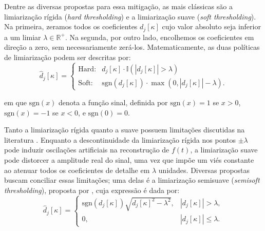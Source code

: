 Dentre as diversas propostas para essa mitigação, as mais clássicas são a limiarização rígida (\emph{hard thresholding}) e a limiarização suave (\emph{soft thresholding}). 
Na primeira, zeramos todos os coeficientes \(d_j[\kappa]\) cujo valor absoluto seja inferior a um limiar \(\lambda \in \mathbb{R}^{+}\). 
Na segunda, por outro lado, encolhemos os coeficientes em direção a zero, sem necessariamente zerá-los. 
Matematicamente, as duas políticas de limiarização podem ser descritas por: 
\begin{equation}
    \hat{d}_j[\kappa] = 
    \begin{cases} 
        \text{Hard:} & d_j[\kappa] \cdot \mathbb{I}(|d_j[\kappa]| > \lambda) \\
        \text{Soft:} & \mathrm{sgn}(d_j[\kappa]) \cdot \max(0, |d_j[\kappa]| - \lambda).
    \end{cases}
    \label{eq:threshold_policies}
\end{equation}

\noindent em que \(\mathrm{sgn}(x)\) denota a função sinal, definida por \(\mathrm{sgn}(x) = 1\) se \(x > 0\), \(\mathrm{sgn}(x) = -1\) se \(x < 0\), e \(\mathrm{sgn}(0)=0\).


Tanto a limiarização rígida quanto a suave possuem limitações discutidas na literatura \cite{mallat_wavelet_2009, vidakovic_statistical_1999}.
Enquanto a descontinuidade da limiarização rígida nos pontos \(\pm\lambda\) pode induzir oscilações artificiais na reconstrução de \(f(t)\), a limiarização suave pode distorcer a amplitude real do sinal, uma vez que impõe um viés constante ao atenuar todos os coeficientes de detalhe em \(\lambda\) unidades. 
Diversas propostas buscam conciliar essas limitações; uma delas é a limiarização semisuave (\emph{semisoft thresholding}), proposta por , cuja expressão é dada por:
\begin{equation}
    \hat{d}_j[\kappa] = 
    \begin{cases} 
        \mathrm{sgn}(d_j[\kappa])\sqrt{d_j[\kappa]^2 - \lambda^2}, & |d_j[\kappa]| > \lambda, \\
        0, & |d_j[\kappa]| \leq \lambda.
    \end{cases}
    \label{eq:hyperbolic_threshold}
\end{equation}


